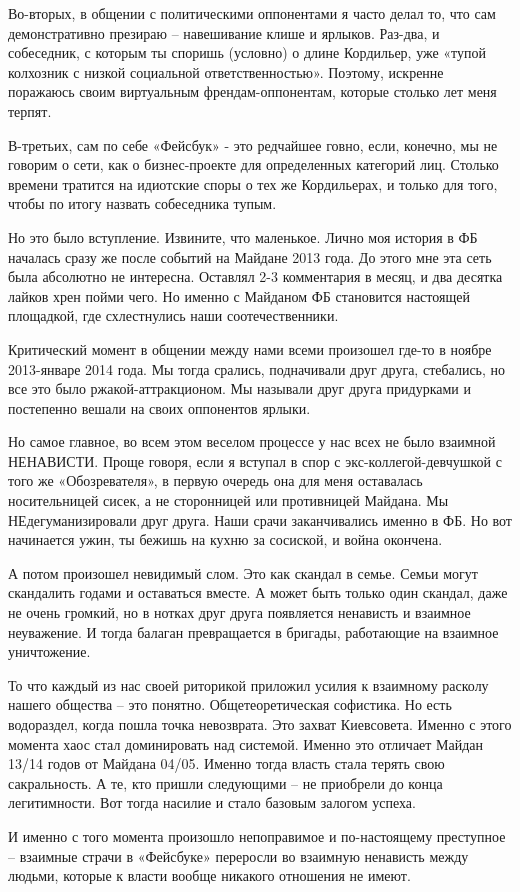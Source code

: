 Во-вторых, в общении с политическими оппонентами я часто делал то, что сам
демонстративно презираю – навешивание клише и ярлыков. Раз-два, и собеседник, с
которым ты споришь (условно) о длине Кордильер, уже «тупой колхозник с низкой
социальной ответственностью». Поэтому, искренне поражаюсь своим виртуальным
френдам-оппонентам, которые столько лет меня терпят.

В-третьих, сам по себе «Фейсбук» - это редчайшее говно, если, конечно, мы не
говорим о сети, как о бизнес-проекте для определенных категорий лиц. Столько
времени тратится на идиотские споры о тех же Кордильерах, и только для того,
чтобы по итогу назвать собеседника тупым.

Но это было вступление. Извините, что маленькое. Лично моя история в ФБ
началась сразу же после событий на Майдане 2013 года. До этого мне эта сеть
была абсолютно не интересна. Оставлял 2-3 комментария в месяц, и два десятка
лайков хрен пойми чего. Но именно с Майданом ФБ становится настоящей площадкой,
где схлестнулись наши соотечественники.

Критический момент в общении между нами всеми произошел где-то в ноябре
2013-январе 2014 года. Мы тогда срались, подначивали друг друга, стебались, но
все это было ржакой-аттракционом. Мы называли друг друга придурками и
постепенно вешали на своих оппонентов ярлыки.

Но самое главное, во всем этом веселом процессе у нас всех не было взаимной
НЕНАВИСТИ. Проще говоря, если я вступал в спор с экс-коллегой-девчушкой с того
же «Обозревателя», в первую очередь она для меня оставалась носительницей
сисек, а не сторонницей или противницей Майдана. Мы НЕдегуманизировали друг
друга. Наши срачи заканчивались именно в ФБ. Но вот начинается ужин, ты бежишь
на кухню за сосиской, и война окончена.

А потом произошел невидимый слом. Это как скандал в семье. Семьи могут
скандалить годами и оставаться вместе. А может быть только один скандал, даже
не очень громкий, но в нотках друг друга появляется ненависть и взаимное
неуважение. И тогда балаган превращается в бригады, работающие на взаимное
уничтожение.

То что каждый из нас своей риторикой приложил усилия к взаимному расколу нашего
общества – это понятно. Общетеоретическая софистика. Но есть водораздел, когда
пошла точка невозврата. Это захват Киевсовета. Именно с этого момента хаос стал
доминировать над системой. Именно это отличает Майдан 13/14 годов от Майдана
04/05. Именно тогда власть стала терять свою сакральность. А те, кто пришли
следующими – не приобрели до конца легитимности. Вот тогда насилие и стало
базовым залогом успеха.

И именно с того момента произошло непоправимое и по-настоящему преступное –
взаимные страчи в «Фейсбуке» переросли во взаимную ненависть между людьми,
которые к власти вообще никакого отношения не имеют.

